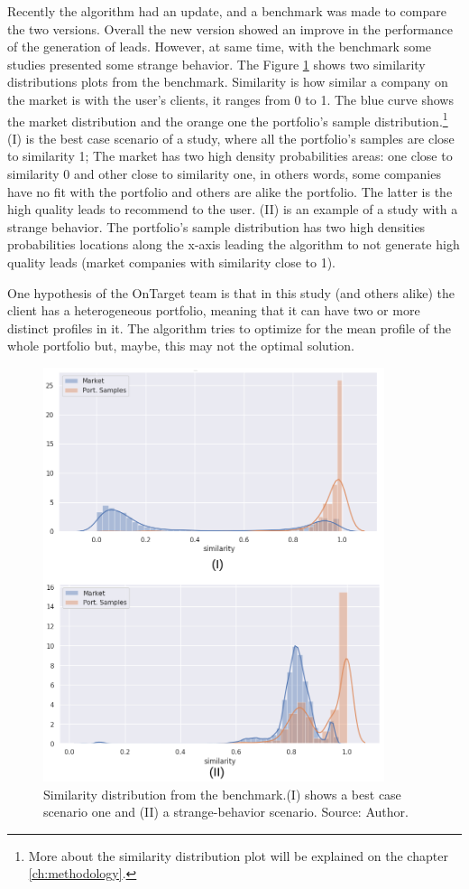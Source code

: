 Recently the algorithm had an update, and a benchmark was made to compare the two versions. Overall the new version showed an improve in the performance of the generation of leads. However, at same time, with the benchmark some studies presented some strange behavior. The Figure \ref{fig:simi-dist-expected-real} shows two similarity distributions plots from the benchmark. Similarity is how similar a company on the market is with the user's clients, it ranges from 0 to 1. The blue curve shows the market distribution and the orange one the portfolio's sample distribution.\footnote{More about the similarity distribution plot will be explained on the chapter \ref{ch:methodology}.}
(I) is the best case scenario of a study, where all the portfolio's samples are close to similarity 1; The market has two high density probabilities areas: one close to similarity 0 and other close to similarity one, in others words, some companies have no fit with the portfolio and others are alike the portfolio. The latter is the high quality leads to recommend to the user. (II) is an example of a study with a strange behavior. The portfolio's sample distribution has two high densities probabilities locations along the x-axis leading the algorithm to not generate high quality leads (market companies with similarity close to 1). 

One hypothesis of the OnTarget team is that in this study (and others alike) the client has a heterogeneous portfolio, meaning that it can have two or more distinct profiles in it. The algorithm tries to optimize for the mean profile of the whole portfolio but, maybe, this may not the optimal solution.

\begin{figure}
   \centering
   \includegraphics[width=10cm]{fig/int-simi-dist-expected-real.png} 
   \caption{Similarity distribution from the benchmark.(I) shows a best case scenario one and (II) a strange-behavior scenario. Source: Author.}
   \label{fig:simi-dist-expected-real}
\end{figure}

